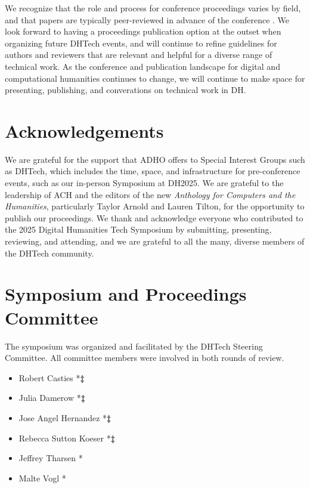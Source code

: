 \documentclass[final]{anthology-ch} %
\begin{document}
We recognize that the role and process for conference proceedings varies by field, and that papers are typically peer-reviewed in advance of the conference \cite{10.63744@rWDzgqfDLYNm}. We look forward to having a proceedings publication option at the outset when organizing future DHTech events, and will continue to refine guidelines for authors and reviewers that are relevant and helpful for a diverse range of technical work.  As the conference and publication landscape for digital and computational humanities continues to change, we will continue to make space for presenting, publishing, and converations on technical work in DH. 

\section*{Acknowledgements}

We are grateful for the support that ADHO offers to Special Interest Groups such as DHTech, which includes the time, space, and infrastructure for pre-conference events, such as our in-person Symposium at DH2025. We are grateful to the leadership of ACH and the editors of the new \textit{Anthology for Computers and the Humanities}, particularly Taylor Arnold and Lauren Tilton, for the opportunity to publish our proceedings. We thank and acknowledge everyone who contributed to the 2025 Digital Humanities Tech Symposium by submitting, presenting, reviewing, and attending, and we are grateful to all the many, diverse members of the DHTech community.

\printbibliography

\appendix
\section*{Symposium and Proceedings Committee}

The symposium was organized and facilitated by the DHTech Steering Committee.  All committee members were involved in both rounds of review.

\begin{itemize}
    \item Robert Casties  *\textbf{\textdagger}\textbf{‡} 
    \item Julia Damerow  *\textbf{\textdagger}\textbf{‡}
    \item Jose Angel Hernandez  *\textbf{\textdagger}\textbf{‡} 
    \item Rebecca Sutton Koeser *\textbf{\textdagger}\textbf{‡} 
    \item Jeffrey Tharsen *\textbf{\textdagger}
    \item Malte Vogl *\textbf{\textdagger}
\end{itemize}
\end{document}
